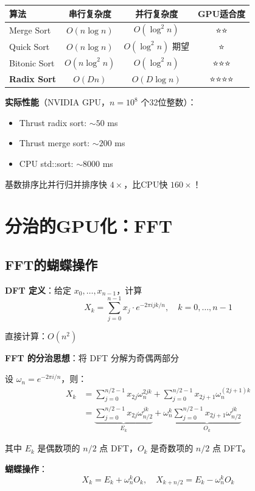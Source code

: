 \documentclass[12pt, a4paper]{ctexart}
\begin{document}
\begin{complexitybox}[排序算法GPU性能对比]

\begin{center}
\begin{tabular}{l|ccc}
\textbf{算法} & \textbf{串行复杂度} & \textbf{并行复杂度} & \textbf{GPU适合度} \\
\hline
Merge Sort & $O(n \log n)$ & $O(\log^2 n)$ & ⭐⭐ \\
Quick Sort & $O(n \log n)$ & $O(\log^2 n)$ 期望 & ⭐ \\
Bitonic Sort & $O(n \log^2 n)$ & $O(\log^2 n)$ & ⭐⭐⭐ \\
\textbf{Radix Sort} & $O(Dn)$ & $O(D \log n)$ & ⭐⭐⭐⭐ \\
\end{tabular}
\end{center}

\textbf{实际性能}（NVIDIA GPU，$n = 10^8$ 个32位整数）：
\begin{itemize}
    \item Thrust radix sort: $\sim 50$ ms
    \item Thrust merge sort: $\sim 200$ ms
    \item CPU std::sort: $\sim 8000$ ms
\end{itemize}

基数排序比并行归并排序快 $4\times$，比CPU快 $160\times$！

\end{complexitybox}

\section{分治的GPU化：FFT}

\subsection{FFT的蝴蝶操作}

\begin{blackboard}

\textbf{DFT 定义}：给定 $x_0, \ldots, x_{n-1}$，计算
\[
X_k = \sum_{j=0}^{n-1} x_j \cdot e^{-2\pi i jk/n}, \quad k = 0, \ldots, n-1
\]

直接计算：$O(n^2)$

\textbf{FFT 的分治思想}：将 DFT 分解为奇偶两部分

设 $\omega_n = e^{-2\pi i/n}$，则：
\begin{align*}
X_k &= \sum_{j=0}^{n/2-1} x_{2j} \omega_n^{2jk} + \sum_{j=0}^{n/2-1} x_{2j+1} \omega_n^{(2j+1)k} \\
&= \underbrace{\sum_{j=0}^{n/2-1} x_{2j} \omega_{n/2}^{jk}}_{E_k} + \omega_n^k \underbrace{\sum_{j=0}^{n/2-1} x_{2j+1} \omega_{n/2}^{jk}}_{O_k}
\end{align*}

其中 $E_k$ 是偶数项的 $n/2$ 点 DFT，$O_k$ 是奇数项的 $n/2$ 点 DFT。

\textbf{蝴蝶操作}：
\[
X_k = E_k + \omega_n^k O_k, \quad X_{k+n/2} = E_k - \omega_n^k O_k
\]

\end{blackboard}
\end{document}
